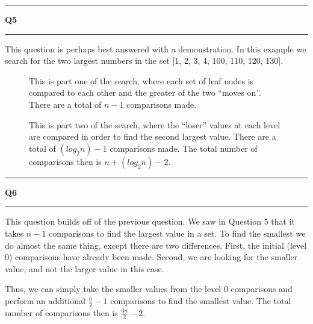 \documentclass[11pt]{article}
\newcommand\question[2]{\vspace{.25in}\hrule\textbf{#1 #2}\vspace{.5em}\hrule\vspace{.10in}}
\begin{document}
\question{Q5}{}
This question is perhaps best answered with a demonstration. In this example we search for the two largest numbers in the set [1, 2, 3, 4, 100, 110, 120, 130].
\begin{figure}[h!]
\centering
{}
\caption{This is part one of the search, where each set of leaf nodes is compared to each other and the greater of the two ``moves on''. There are a total of $n-1$ comparisons made.}
\end{figure}

\begin{figure}[h!]
\centering
{}
\caption{This is part two of the search, where the ``loser'' values at each level are compared in order to find the second largest value. There are a total of $(log_2 n) - 1$ comparisons made. The total number of comparisons then is $n + (log_2 n) - 2$.}
\end{figure}

\pagebreak
\question{Q6}{}
This question builds off of the previous question. We saw in Question 5 that it takes $n-1$ comparisons to find the largest value in a set. To find the smallest we do almost the same thing, except there are two differences. First, the initial (level 0) comparisons have already been made. Second, we are looking for the smaller value, and not the larger value in this case.

Thus, we can simply take the smaller values from the level 0 comparisons and perform an additional $\frac{n}{2} - 1$ comparisons to find the smallest value. The total number of comparisons then is $\frac{3n}{2}-2$.
\end{document}
